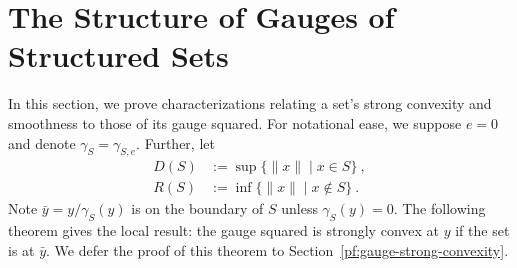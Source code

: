 \documentclass[sn-mathphys,Numbered]{sn-jnl}%
\begin{document}
\section{The Structure of Gauges of Structured Sets}\label{sec:main_result}

In this section, we prove characterizations relating a set's strong convexity and smoothness to those of its gauge squared. For notational ease, we suppose $e=0$ and denote $\gamma_S = \gamma_{S,e}$. Further, let
\begin{align}
    D(S) &:= \sup \{\|x\| \mid x\in S\}  \label{eq:D} \ ,\\
    R(S) &:= \inf \{\|x\| \mid x\notin S\} \label{eq:R} \ .
\end{align} 
Note $\bar y = y/\gamma_S(y)$ is on the boundary of $S$ unless $\gamma_S(y)=0$.
The following theorem gives the local result: the gauge squared is strongly convex at $y$ if the set is at $\bar y$. We defer the proof of this theorem to Section~\ref{pf:gauge-strong-convexity}.
\end{document}

